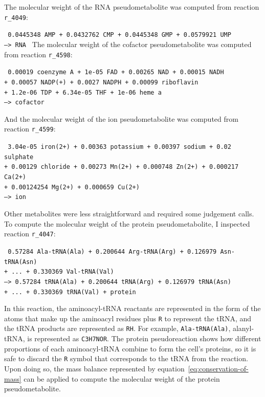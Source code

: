 The molecular weight of the RNA pseudometabolite was computed from reaction \texttt{r\_4049}:

\texttt{
  0.0445348 AMP + 0.0432762 CMP + 0.0445348 GMP + 0.0579921 UMP \\
  --> RNA
}
The molecular weight of the cofactor pseudometabolite was computed from reaction \texttt{r\_4598}:

\texttt{
  0.00019 coenzyme A + 1e-05 FAD + 0.00265 NAD + 0.00015 NADH \\
  + 0.00057 NADP(+) + 0.0027 NADPH + 0.00099 riboflavin \\
  + 1.2e-06 TDP + 6.34e-05 THF + 1e-06 heme a \\
  --> cofactor
}

And the molecular weight of the ion pseudometabolite was computed from reaction \texttt{r\_4599}:

\texttt{
  3.04e-05 iron(2+) + 0.00363 potassium + 0.00397 sodium + 0.02 sulphate \\
  + 0.00129 chloride + 0.00273 Mn(2+) + 0.000748 Zn(2+) + 0.000217 Ca(2+) \\
  + 0.00124254 Mg(2+) + 0.000659 Cu(2+) \\
  --> ion
}

Other metabolites were less straightforward and required some judgement calls.
To compute the molecular weight of the protein pseudometabolite, I inspected reaction \texttt{r\_4047}:

\texttt{
  0.57284 Ala-tRNA(Ala) + 0.200644 Arg-tRNA(Arg) + 0.126979 Asn-tRNA(Asn)\\
  + ... + 0.330369 Val-tRNA(Val) \\
  --> 0.57284 tRNA(Ala) + 0.200644 tRNA(Arg) + 0.126979 tRNA(Asn) \\
  + ... + 0.330369 tRNA(Val) + protein
}

In this reaction, the aminoacyl-tRNA reactants are represented in the form of the atoms that make up the aminoacyl residues plus \texttt{R} to represent the tRNA, and the tRNA products are represented as \texttt{RH}.
For example, \texttt{Ala-tRNA(Ala)}, alanyl-tRNA, is represented as \texttt{C3H7NOR}.
The protein pseudoreaction shows how different proportions of each aminoacyl-tRNA combine to form the cell's proteins, so it is safe to discard the \texttt{R} symbol that corresponds to the tRNA from the reaction.
Upon doing so, the mass balance represented by equation~\ref{eq:conservation-of-mass} can be applied to compute the molecular weight of the protein pseudometabolite.

